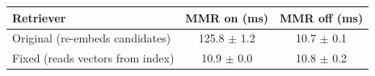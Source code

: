 \begin{tabular}{@{}lcc@{}}
\toprule
Retriever & MMR on (ms) & MMR off (ms) \\
\midrule
Original (re-embeds candidates) & 125.8 $\pm$ 1.2 & 10.7 $\pm$ 0.1 \\
Fixed (reads vectors from index) & 10.9 $\pm$ 0.0 & 10.8 $\pm$ 0.2 \\
\bottomrule
\end{tabular}